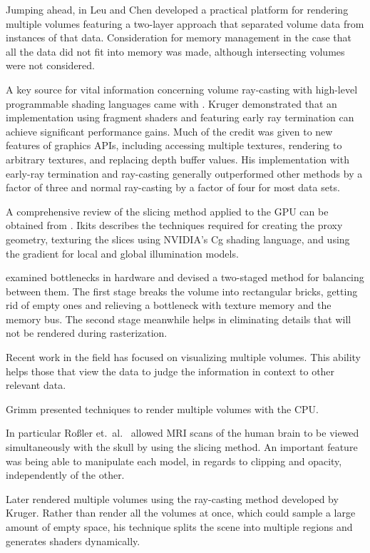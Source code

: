\documentclass{report}
\begin{document}
Jumping ahead, in \cite{Leu99} Leu and Chen developed a practical platform for
rendering multiple volumes featuring a two-layer approach that separated volume
data from instances of that data.  Consideration for memory management in the
case that all the data did not fit into memory was made, although intersecting
volumes were not considered.

A key source for vital information concerning volume ray-casting with high-level
programmable shading languages came with \cite{Kruger03}.  Kruger demonstrated
that an implementation using fragment shaders and featuring early ray
termination can achieve significant performance gains.  Much of the credit was
given to new features of graphics APIs, including accessing multiple textures,
rendering to arbitrary textures, and replacing depth buffer values.  His
implementation with early-ray termination and ray-casting generally outperformed
other methods by a factor of three and normal ray-casting by a factor of four
for most data sets.

A comprehensive review of the slicing method applied to the GPU can be obtained
from \cite{Ikits04}.  Ikits describes the techniques required for creating the
proxy geometry, texturing the slices using NVIDIA’s Cg shading language, and
using the gradient for local and global illumination models.

\cite{Ruijters06} examined bottlenecks in hardware and devised a two-staged
method for balancing between them.  The first stage breaks the volume into
rectangular bricks, getting rid of empty ones and relieving a bottleneck with
texture memory and the memory bus.  The second stage meanwhile helps in
eliminating details that will not be rendered during rasterization.

Recent work in the field has focused on visualizing multiple volumes.  This
ability helps those that view the data to judge the information in context to
other relevant data.

Grimm \cite{Grimm04} presented techniques to render multiple volumes with the
CPU.

In particular Roßler et.\ al.\ \cite{Rossler06} allowed MRI scans of the human
brain to be viewed simultaneously with the skull by using the slicing method.
An important feature was being able to manipulate each model, in regards to
clipping and opacity, independently of the other.

Later \cite{Rossler08} rendered multiple volumes using the ray-casting method
developed by Kruger.  Rather than render all the volumes at once, which could
sample a large amount of empty space, his technique splits the scene into
multiple regions and generates shaders dynamically.
\end{document}
